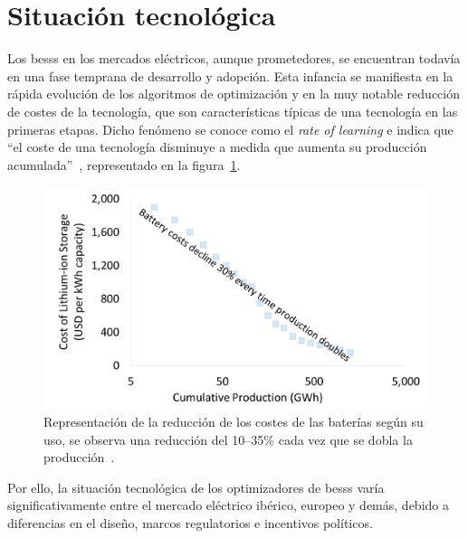 \section{Situación tecnológica}
\label{makereference2.1}

Los \glspl{bess} en los mercados eléctricos, aunque prometedores, se encuentran todavía en una fase temprana de desarrollo y adopción. Esta infancia se manifiesta en la rápida evolución de los algoritmos de optimización y en la muy notable reducción de costes de la tecnología, que son características típicas de una tecnología en las primeras etapas. Dicho fenómeno se conoce como el \textit{rate of learning} e indica que ``el coste de una tecnología disminuye a medida que aumenta su producción acumulada''~\cite{mathew2021climate, louwen2018technological}, representado en la figura~\ref{fig:rate-of-learning}.

\begin{figure}
  \centering
  \includegraphics[width=0.75\linewidth]{figures/rate-of-learning.jpg}
  \caption{Representación de la reducción de los costes de las baterías según su uso, se observa una reducción del 10--35\% cada vez que se dobla la producción~\cite{irena2025irena}.}
  \label{fig:rate-of-learning}
\end{figure}

Por ello, la situación tecnológica de los optimizadores de \glspl{bess} varía significativamente entre el mercado eléctrico ibérico, europeo y demás, debido a diferencias en el diseño, marcos regulatorios e incentivos políticos.

